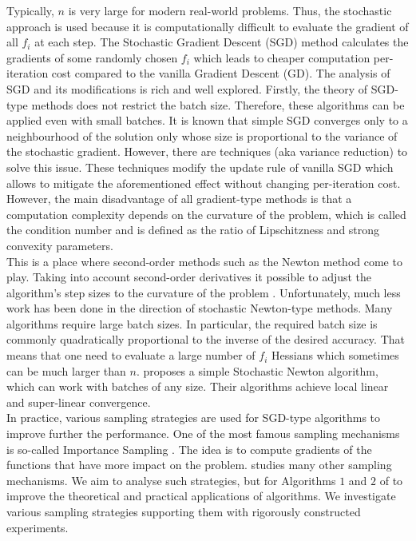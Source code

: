 \documentclass{article}
\begin{document}
	Typically, $n$ is very large for modern real-world problems. Thus, the stochastic approach is used because it is computationally difficult to evaluate the gradient of all $f_i$ at each step. The Stochastic Gradient Descent (SGD) method \cite{SGD-1} calculates the gradients of some randomly chosen $f_i$ which leads to cheaper computation per-iteration cost compared to the vanilla Gradient Descent (GD). The analysis of SGD and its modifications is rich and well explored. Firstly, the theory of SGD-type methods does not restrict the batch size. Therefore, these algorithms can be applied even with small batches. It is known that simple SGD converges only to a neighbourhood of the solution only \cite{sgd-hogwild, sgd-general-analysis} whose size is proportional to the variance of the stochastic gradient. However, there are techniques (aka variance reduction) to solve this issue. These techniques \cite{exp-convergence, advances-NIPS, unified-sgd, one-method} modify the update rule of vanilla SGD which allows to mitigate the aforementioned effect without changing per-iteration cost. However, the main disadvantage of all gradient-type methods is that a computation complexity depends on the curvature of the problem, which is called the condition number and is defined as the ratio of Lipschitzness and strong convexity parameters. \\
	
	This is a place where second-order methods such as the Newton method \cite{Nesterov-introductory, Newton-convergence, RSN} come to play. Taking into account second-order derivatives it possible to adjust the algorithm's step sizes to the curvature of the problem \cite{Nesterov-introductory}. Unfortunately, much less work has been done in the direction of stochastic Newton-type methods. Many algorithms \cite{sub-sampled, exact-inexact, variance-reduced-Newton, zhang2022adaptive, tripuraneni2018stochastic, zhou2020stochastic} require large batch sizes. In particular, the required batch size is commonly quadratically proportional to the inverse of the desired accuracy. That means that one need to evaluate a large number of $f_i$ Hessians which sometimes can be much larger than $n$. \cite{kovalev2019stochastic} proposes a simple Stochastic Newton algorithm, which can work with batches of any size. Their algorithms achieve local linear and super-linear convergence. \\
	
	In practice, various sampling strategies are used for SGD-type algorithms to improve further the performance. One of the most famous sampling mechanisms is so-called Importance Sampling \cite{https://doi.org/10.48550/arxiv.1401.2753, 9413313}. The idea is to compute gradients of the functions that have more impact on the problem. \cite{richtarik2016parallel} studies many other sampling mechanisms. We aim to analyse such strategies, but for Algorithms $1$ and $2$ of \cite{kovalev2019stochastic} to improve the theoretical and practical applications of algorithms. We investigate various sampling strategies supporting them with  rigorously constructed experiments. 
	
	
	
\renewcommand\refname{References}	


\end{document}
